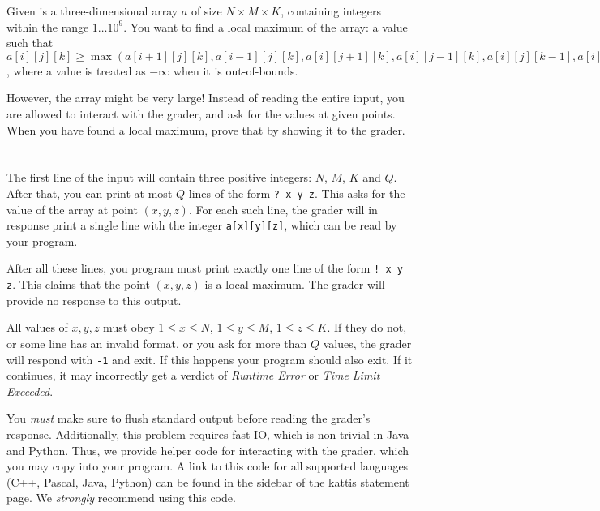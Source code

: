 \ifx\boi\undefined\fi
\def\version{jury-draft}

Given is a three-dimensional array $a$ of size $N \times M \times K$, containing integers within the range $1 \dots 10^9$.
You want to find a local maximum of the array: a value such that $a[i][j][k] \ge \max(a[i+1][j][k], a[i-1][j][k], a[i][j+1][k], a[i][j-1][k], a[i][j][k-1], a[i][j][k+1])$,
where a value is treated as $-\infty$ when it is out-of-bounds.

However, the array might be very large!
Instead of reading the entire input, you are allowed to interact with the grader, and ask for the values at given points.
When you have found a local maximum, prove that by showing it to the grader.

\section*{\interactivity}
The first line of the input will contain three positive integers: $N$, $M$, $K$ and $Q$.
After that, you can print at most $Q$ lines of the form \texttt{? x y z}.
This asks for the value of the array at point $(x, y, z)$.
For each such line, the grader will in response print a single line with the integer \texttt{a[x][y][z]}, which can be read by your program.

After all these lines, you program must print exactly one line of the form \texttt{! x y z}.
This claims that the point $(x, y, z)$ is a local maximum.
The grader will provide no response to this output.

All values of $x, y, z$ must obey $1 \le x \le N$, $1 \le y \le M$, $1 \le z \le K$.
If they do not, or some line has an invalid format, or you ask for more than $Q$ values,
the grader will respond with \texttt{-1} and exit.
If this happens your program should also exit. If it continues, it may incorrectly get
a verdict of \emph{Runtime Error} or \emph{Time Limit Exceeded}.

You \emph{must} make sure to flush standard output before reading the grader's response.
Additionally, this problem requires fast IO, which is non-trivial in Java and Python.
Thus, we provide helper code for interacting with the grader, which you may copy into your program.
A link to this code for all supported languages (C++, Pascal, Java, Python) can
be found in the sidebar of the kattis statement page.
We \emph{strongly} recommend using this code.

